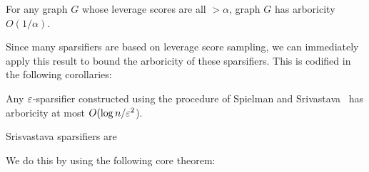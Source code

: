 \begin{theorem}
  For any graph $G$ whose leverage scores are all $ > \alpha$, graph $G$
  has arboricity $O(1/ \alpha)$.
\end{theorem}

Since many sparsifiers are based on leverage score sampling, we can
immediately apply this result to bound the arboricity of these
sparsifiers. This is codified in the following corollaries:

\begin{corollary} 
  Any $\varepsilon$-sparsifier constructed using the procedure of Spielman and
  Srivastava~\cite{SpielmanS08} has arboricity at most $O(\log n /
  \varepsilon^2$).
\end{corollary}

Srisvastava sparsifiers are 

We do this by using the following core theorem:

